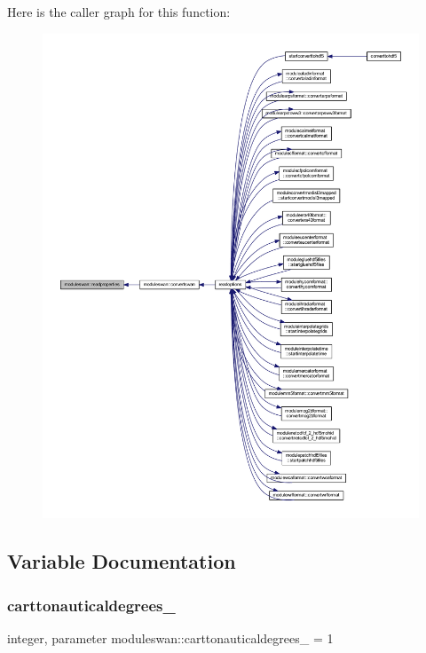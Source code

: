 Here is the caller graph for this function\+:\nopagebreak
\begin{figure}[H]
\begin{center}
\leavevmode
\includegraphics[width=350pt]{namespacemoduleswan_a15e0f14f5229674aebdd25f0a49a7df2_icgraph}
\end{center}
\end{figure}


\subsection{Variable Documentation}
\mbox{\label{namespacemoduleswan_a7dcf058a93532c9c6a8d2b3e0089c082}} 
\subsubsection{\texorpdfstring{carttonauticaldegrees\+\_\+}{carttonauticaldegrees\_}}
{\footnotesize\ttfamily integer, parameter moduleswan\+::carttonauticaldegrees\+\_\+ = 1\hspace{0.3cm}{\ttfamily [private]}}

